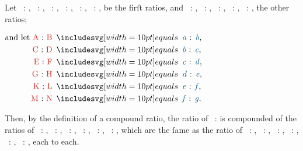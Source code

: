 \documentclass[12pt,preview]{standalone}
\begin{document}
\begin{minipage}{\textwidth}
    \raggedright Let \redA\ : \redB, \redC\ : \redD, \redE\ : \redF, \redG\ : \redH, \redK\ : \redL, \redM\ : \redN, be the firſt ratios, and \yellowO\ : \yellowP, \yellowQ\ : \yellowR, \yellowS\ : \yellowT, \yellowV\ : \yellowW, \yellowX\ : \yellowY, the other ratios;

    \hfill

    \begin{center}
        $\begin{aligned}
                \text{and let \redA\ : \redB} & \bequals \text{\bluea\ : \blueb,} \\
                \text{\redC\ : \redD}         & \bequals \text{\blueb\ : \bluec,} \\
                \text{\redE\ : \redF}         & \bequals \text{\bluec\ : \blued,} \\
                \text{\redG\ : \redH}         & \bequals \text{\blued\ : \bluee,} \\
                \text{\redK\ : \redL}         & \bequals \text{\bluee\ : \bluef,} \\
                \text{\redM\ : \redN}         & \bequals \text{\bluef\ : \blueg.}
            \end{aligned}$
    \end{center}

    \hfill

    \hfill

    Then, by the definition of a compound ratio, the ratio of \bluea\ : \blueg is compounded of the ratios of \bluea\ : \blueb, \blueb\ : \bluec, \bluec\ : \blued, \blued\ : \bluee, \bluee\ : \bluef, \bluef\ : \blueg, which are the ſame as the ratio of \redA\ : \redB, \redC\ : \redD, \redE\ : \redF, \redG\ : \redH, \redK\ : \redL, \redM\ : \redN, each to each.

\end{minipage}

\newpage
\end{document}
